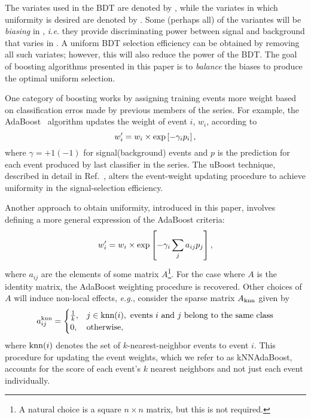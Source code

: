 The variates used in the BDT are denoted by \x, while the variates in which uniformity is desired are denoted by \y.  Some (perhaps all) of the \x variantes will be {\em biasing} in \y, {\em i.e.} they provide discriminating power between signal and background that varies in \y.  A uniform BDT selection efficiency can be obtained by removing all such variates; however, this will also reduce the power of the BDT.  The goal of boosting algorithms presented in this paper is to {\em balance} the biases to produce the optimal uniform selection.

One category of boosting works by assigning training events more weight based on classification erros made by previous members of the series.  For example, the AdaBoost~\cite{ref:adaboost} algorithm updates the weight of event $i$, $w_i$, according to
\begin{equation}
w_i^{\prime} = w_i \times {\rm exp}\left[-\gamma_i p_i\right], 
\end{equation}
where $\gamma = +1(-1)$ for signal(background) events and $p$ is the prediction for each event produced by last classifier in the series.  
The uBoost technique, described in detail in Ref.~\cite{cit:uboost}, alters the event-weight updating procedure to achieve uniformity in the signal-selection efficiency. 


Another approach to obtain uniformity, introduced in this paper, involves defining a more general expression of the AdaBoost criteria:
\begin{equation}
 w_i^{\prime} = w_i \times {\rm exp}\left[-\gamma_i \sum_j a_{ij} p_j\right],
\end{equation}
where $a_{ij}$ are the elements of some matrix $A$\footnote{A natural choice is a square $n\times n$ matrix, but this is not required.}.  For the case where $A$ is the identity matrix, the AdaBoost weighting procedure is recovered.  
Other choices of $A$ will induce non-local effects, {\em e.g.}, consider the sparse matrix $A_{\rm knn}$ given by
\begin{equation}
  a_{ij}^{\rm knn} = \begin{cases} 
    \frac{1}{k}, & j \in \text{knn}(i), \text{ events $i$ and $j$ belong to the same class} \\
    0, & \text{otherwise},
\end{cases}
\end{equation}
where $\text{knn}(i)$ denotes the set of $k$-nearest-neighbor events to event $i$.
This procedure for updating the event weights, which we refer to as kNNAdaBoost, accounts for the score of each event's $k$ nearest neighbors and not just each event individually.


